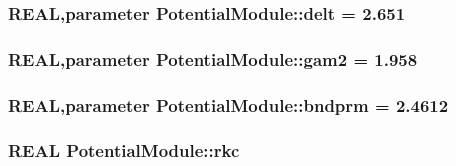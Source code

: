 \hypertarget{namespace_potential_module_a19c3989862133abb6235ae587fe8b229}{
\subsubsection[{delt}]{\setlength{\rightskip}{0pt plus 5cm}REAL,parameter {\bf PotentialModule::delt} = 2.651}}
\label{namespace_potential_module_a19c3989862133abb6235ae587fe8b229}
\hypertarget{namespace_potential_module_a405bc5381d283c3cd58d018d03e83017}{
\subsubsection[{gam2}]{\setlength{\rightskip}{0pt plus 5cm}REAL,parameter {\bf PotentialModule::gam2} = 1.958}}
\label{namespace_potential_module_a405bc5381d283c3cd58d018d03e83017}
\hypertarget{namespace_potential_module_a35408fb0f2283fa2417890b7aef4f054}{
\subsubsection[{bndprm}]{\setlength{\rightskip}{0pt plus 5cm}REAL,parameter {\bf PotentialModule::bndprm} = 2.4612}}
\label{namespace_potential_module_a35408fb0f2283fa2417890b7aef4f054}
\hypertarget{namespace_potential_module_a4924d732b6124ef59e9b15aaf63a7160}{
\subsubsection[{rkc}]{\setlength{\rightskip}{0pt plus 5cm}REAL {\bf PotentialModule::rkc}}}
\label{namespace_potential_module_a4924d732b6124ef59e9b15aaf63a7160}

